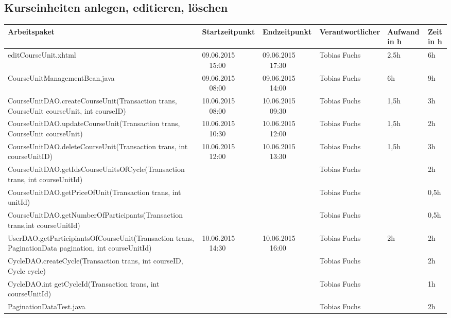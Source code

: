 \begin{landscape}
	\subsection{Kurseinheiten anlegen, editieren, löschen}
	\begin{tabular}{|p{10.3cm}|p{3.2cm}|p{3.2cm}|p{3.5cm}|p{1.7cm}|p{1.5cm}|}
		\hline  \textbf{Arbeitspaket} & \textbf{Startzeitpunkt} & \textbf{Endzeitpunkt} & \textbf{Verantwortlicher}  & \textbf{Aufwand in h} & \textbf{Zeit in h}\\ 
		\hline   editCourseUnit.xhtml                                       & 09.06.2015 \ \ 15:00       & 09.06.2015  \ \  17:30     & Tobias Fuchs &  2,5h                & 6h \\
		\hline   CourseUnitManagementBean.java                              & 09.06.2015 \ \ 08:00       & 09.06.2015  \ \  14:00     & Tobias Fuchs &  6h                  & 9h\\
		\hline   CourseUnitDAO.createCourseUnit(Transaction trans, CourseUnit courseUnit, int courseID)  & 10.06.2015 \ \ 08:00       & 10.06.2015  \ \  09:30      &  Tobias Fuchs &   1,5h   & 3h \\ 
		\hline   CourseUnitDAO.updateCourseUnit(Transaction trans, CourseUnit courseUnit)                & 10.06.2015 \ \ 10:30       & 10.06.2015  \ \  12:00      & Tobias Fuchs &   1,5h & 2h\\ 
		\hline   CourseUnitDAO.deleteCourseUnit(Transaction trans, int courseUnitID)                     & 10.06.2015 \ \ 12:00       & 10.06.2015  \ \  13:30      & Tobias Fuchs &   1,5h & 3h\\
		\hline    CourseUnitDAO.getIdsCourseUnitsOfCycle(Transaction trans, int courseUnitId)             &      &                    &     Tobias Fuchs    &        & 2h\\
		\hline    CourseUnitDAO.getPriceOfUnit(Transaction trans, int unitId) &      &                    &     Tobias Fuchs    &        & 0,5h\\
		\hline    CourseUnitDAO.getNumberOfParticipants(Transaction trans,int courseUnitId) &      &                    &     Tobias Fuchs    &        & 0,5h\\ 
		\hline   UserDAO.getParticipiantsOfCourseUnit(Transaction trans, PaginationData pagination, int courseUnitId)& 10.06.2015 \ \ 14:30       & 10.06.2015  \ \  16:00     & Tobias Fuchs &   2h                &  2h\\
		\hline CycleDAO.createCycle(Transaction trans, int courseID, Cycle cycle) &      &                    &     Tobias Fuchs    &        & 2h\\
		\hline CycleDAO.int getCycleId(Transaction trans, int courseUnitId) &      &                    &     Tobias Fuchs    &        & 1h\\
		\hline PaginationDataTest.java&      &                    &     Tobias Fuchs    &        & 2h\\
		\hline 
	\end{tabular} \ \\
	\ \\
	
\end{landscape}




